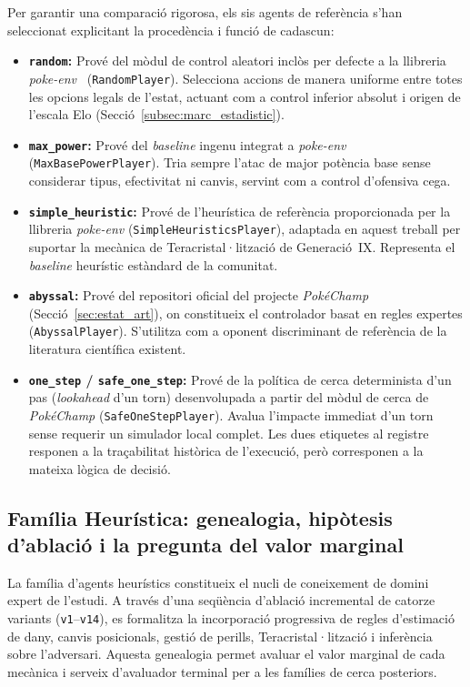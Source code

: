 Per garantir una comparació rigorosa, els sis agents de referència s'han seleccionat explicitant la procedència i funció de cadascun:

\begin{itemize}
    \item \textbf{\texttt{random}:} Prové del mòdul de control aleatori inclòs per defecte a la llibreria \textit{poke-env}~\cite{poke_env} (\texttt{RandomPlayer}). Selecciona accions de manera uniforme entre totes les opcions legals de l'estat, actuant com a control inferior absolut i origen de l'escala Elo (Secció~\ref{subsec:marc_estadistic}).
    \item \textbf{\texttt{max\_power}:} Prové del \emph{baseline} ingenu integrat a \textit{poke-env} (\texttt{MaxBasePowerPlayer}). Tria sempre l'atac de major potència base sense considerar tipus, efectivitat ni canvis, servint com a control d'ofensiva cega.
    \item \textbf{\texttt{simple\_heuristic}:} Prové de l'heurística de referència proporcionada per la llibreria \textit{poke-env} (\texttt{SimpleHeuristicsPlayer}), adaptada en aquest treball per suportar la mecànica de Teracristal·lització de Generació~IX. Representa el \emph{baseline} heurístic estàndard de la comunitat.
    \item \textbf{\texttt{abyssal}:} Prové del repositori oficial del projecte \textit{PokéChamp}~\cite{pokechamp} (Secció~\ref{sec:estat_art}), on constitueix el controlador basat en regles expertes (\texttt{AbyssalPlayer}). S'utilitza com a oponent discriminant de referència de la literatura científica existent.
    \item \textbf{\texttt{one\_step} / \texttt{safe\_one\_step}:} Prové de la política de cerca determinista d'un pas (\emph{lookahead} d'un torn) desenvolupada a partir del mòdul de cerca de \textit{PokéChamp} (\texttt{SafeOneStepPlayer}). Avalua l'impacte immediat d'un torn sense requerir un simulador local complet. Les dues etiquetes al registre responen a la traçabilitat històrica de l'execució, però corresponen a la mateixa lògica de decisió.
\end{itemize}

\subsection{Família Heurística: genealogia, hipòtesis d'ablació i la pregunta del valor marginal}

La família d'agents heurístics constitueix el nucli de coneixement de domini expert de l'estudi. A través d'una seqüència d'ablació incremental de catorze variants (\texttt{v1}--\texttt{v14}), es formalitza la incorporació progressiva de regles d'estimació de dany, canvis posicionals, gestió de perills, Teracristal·lització i inferència sobre l'adversari. Aquesta genealogia permet avaluar el valor marginal de cada mecànica i serveix d'avaluador terminal per a les famílies de cerca posteriors.

